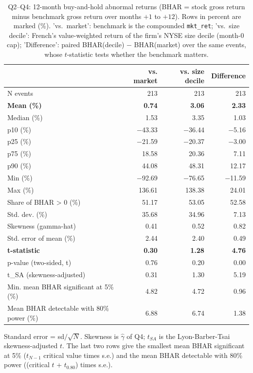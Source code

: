 \begin{table}[!htbp]
\centering
\small
\caption{Q2--Q4: 12-month buy-and-hold abnormal returns (BHAR = stock gross return minus benchmark gross return over months $+1$ to $+12$). Rows in percent are marked (\%). 'vs.\ market': benchmark is the compounded \texttt{mkt\_ret}; 'vs.\ size decile': French's value-weighted return of the firm's NYSE size decile (month-0 cap); 'Difference': paired BHAR(decile) $-$ BHAR(market) over the same events, whose $t$-statistic tests whether the benchmark matters.}
\label{tab:bhar}
\begin{tabular}{lrrr}
\toprule
 & vs. market & vs. size decile & Difference \\
\midrule
N events & 213 & 213 & 213 \\
\addlinespace
\rowcolor[gray]{0.94} \textbf{Mean (\%)} & \textbf{0.74} & \textbf{3.06} & \textbf{2.33} \\
Median (\%) & 1.53 & 3.35 & 1.03 \\
p10 (\%) & $-$43.33 & $-$36.44 & $-$5.16 \\
p25 (\%) & $-$21.59 & $-$20.37 & $-$3.00 \\
p75 (\%) & 18.58 & 20.36 & 7.11 \\
p90 (\%) & 44.08 & 48.31 & 12.17 \\
Min (\%) & $-$92.69 & $-$76.65 & $-$11.59 \\
Max (\%) & 136.61 & 138.38 & 24.01 \\
Share of BHAR > 0 (\%) & 51.17 & 53.05 & 52.58 \\
\addlinespace
Std. dev. (\%) & 35.68 & 34.96 & 7.13 \\
Skewness (gamma-hat) & 0.41 & 0.52 & 0.82 \\
\addlinespace
Std. error of mean (\%) & 2.44 & 2.40 & 0.49 \\
\rowcolor[gray]{0.94} \textbf{t-statistic} & \textbf{0.30} & \textbf{1.28} & \textbf{4.76} \\
p-value (two-sided, t) & 0.76 & 0.20 & 0.00 \\
t\_SA (skewness-adjusted) & 0.31 & 1.30 & 5.19 \\
\addlinespace
Min. mean BHAR significant at 5\% (\%) & 4.82 & 4.72 & 0.96 \\
Mean BHAR detectable with 80\% power (\%) & 6.88 & 6.74 & 1.38 \\
\bottomrule
\end{tabular}
\par\vspace{3pt}
{\footnotesize Standard error = sd$/\sqrt{N}$. Skewness is $\hat\gamma$ of Q4; $t_{SA}$ is the Lyon-Barber-Tsai skewness-adjusted $t$. The last two rows give the smallest mean BHAR significant at 5\% ($t_{N-1}$ critical value times s.e.) and the mean BHAR detectable with 80\% power ((critical $t$ + $t_{0.80}$) times s.e.).}
\end{table}
